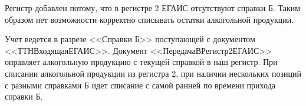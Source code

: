 Регистр добавлен потому, что в регистре 2 ЕГАИС отсутствуют справки Б. Таким образом нет возможности корректно списывать остатки алкогольной продукции.

Учет ведется в разрезе <<Справки Б>> поступающей с документом <<ТТНВходящаяЕГАИС>>. Документ  <<ПередачаВРегистр2ЕГАИС>> оправляет алкогольную продукцию с текущей справкой в наш регистр. При списании алкогольной продукции из регистра 2,  при наличии нескольких позиций с разными справками Б идет списание с самой ранней по времени прихода справки Б.


